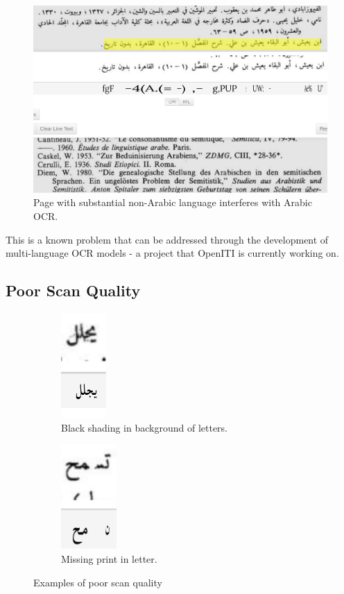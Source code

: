 \begin{figure}
	\centering
	\includegraphics[width=0.9\linewidth]{images/image13.png}
	\caption{Page with substantial non-Arabic language interferes with Arabic OCR.}
	\label{fig3:fig26}
\end{figure}
 
This is a known problem that can be addressed through the development of
multi-language OCR models - a project that OpenITI is currently working on.

\subsection{Poor Scan Quality}

\begin{figure}[H]
	\centering
	\begin{subfigure}[t]{4cm}
	\centering
	\includegraphics[height=4cm]{images/image14.png}
	\caption{Black shading in background of letters.}
	\label{fig3:fig27}
	\end{subfigure}
	\begin{subfigure}[t]{4cm}
	\centering
	\includegraphics[height=4cm]{images/image15.png}
	\caption{Missing print in letter.}
	\label{fig3:fig28}
	\end{subfigure}
	\caption{Examples of poor scan quality}
\end{figure} 

